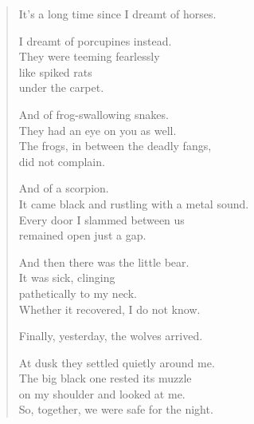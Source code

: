 \begin{verse}
It's a long time since I dreamt of horses.

I dreamt of porcupines instead.\\
They were teeming fearlessly\\
like spiked rats\\
under the carpet.

And of frog-swallowing snakes.\\
They had an eye on you as well.\\
The frogs, in between the deadly fangs,\\
did not complain.

And of a scorpion.\\
It came black and rustling with a metal sound.\\
Every door I slammed between us\\
remained open just a gap.

And then there was the little bear.\\
It was sick, clinging\\
pathetically to my neck.\\
Whether it recovered, I do not know.

Finally, yesterday, the wolves arrived.

At dusk they settled quietly around me.\\
The big black one rested its muzzle\\
on my shoulder and looked at me.\\
So, together, we were safe for the night.
\end{verse}
